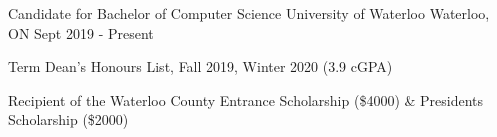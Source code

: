 
\begin{cventries}
  \cventry
    {Candidate for Bachelor of Computer Science} %
    {University of Waterloo} %
    {Waterloo, ON} %
    {Sept 2019 - Present} %
    {
      \begin{cvitems} %
         \item {Term Dean's Honours List, Fall 2019, Winter 2020 (3.9 cGPA)}
         \vspace{0.5mm}
         \item {Recipient of the Waterloo County Entrance Scholarship (\$4000) \& President\textquotesingle s Scholarship (\$2000)}
      \end{cvitems}
    }
\end{cventries}
